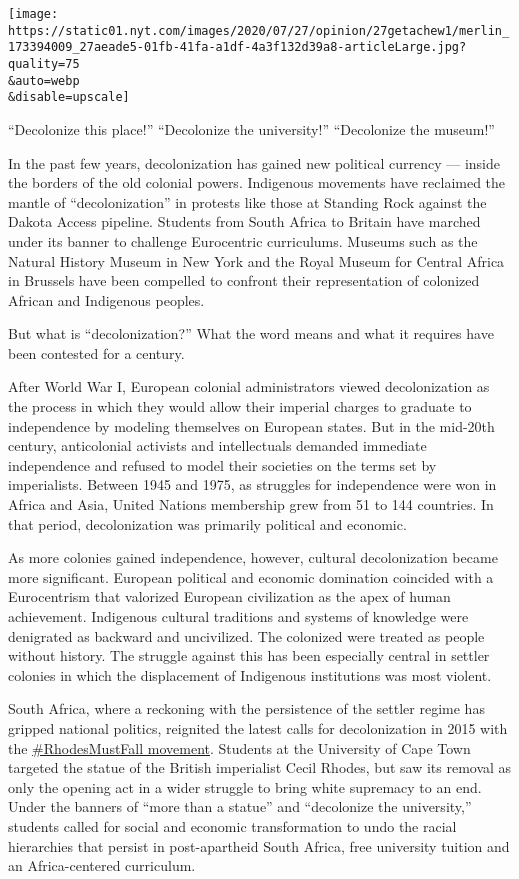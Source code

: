 \texttt{[image: https://static01.nyt.com/images/2020/07/27/opinion/27getachew1/merlin\_173394009\_27aeade5-01fb-41fa-a1df-4a3f132d39a8-articleLarge.jpg?quality=75\\\&auto=webp\\\&disable=upscale]}

``Decolonize this place!'' ``Decolonize the university!'' ``Decolonize
the museum!''

In the past few years, decolonization has gained new political currency
--- inside the borders of the old colonial powers. Indigenous movements
have reclaimed the mantle of ``decolonization'' in protests like those
at Standing Rock against the Dakota Access pipeline. Students from South
Africa to Britain have marched under its banner to challenge Eurocentric
curriculums. Museums such as the Natural History Museum in New York and
the Royal Museum for Central Africa in Brussels have been compelled to
confront their representation of colonized African and Indigenous
peoples.

But what is ``decolonization?'' What the word means and what it requires
have been contested for a century.

After World War I, European colonial administrators viewed
decolonization as the process in which they would allow their imperial
charges to graduate to independence by modeling themselves on European
states. But in the mid-20th century, anticolonial activists and
intellectuals demanded immediate independence and refused to model their
societies on the terms set by imperialists. Between 1945 and 1975, as
struggles for independence were won in Africa and Asia, United Nations
membership grew from 51 to 144 countries. In that period, decolonization
was primarily political and economic.

As more colonies gained independence, however, cultural decolonization
became more significant. European political and economic domination
coincided with a Eurocentrism that valorized European civilization as
the apex of human achievement. Indigenous cultural traditions and
systems of knowledge were denigrated as backward and uncivilized. The
colonized were treated as people without history. The struggle against
this has been especially central in settler colonies in which the
displacement of Indigenous institutions was most violent.

South Africa, where a reckoning with the persistence of the settler
regime has gripped national politics, reignited the latest calls for
decolonization in 2015 with the
\href{https://www.sabcnews.com/sabcnews/rhodesmustfall-wants-statues-representing-oppression-racism-removed/}{\#RhodesMustFall
movement}. Students at the University of Cape Town targeted the statue
of the British imperialist Cecil Rhodes, but saw its removal as only the
opening act in a wider struggle to bring white supremacy to an end.
Under the banners of ``more than a statue'' and ``decolonize the
university,'' students called for social and economic transformation to
undo the racial hierarchies that persist in post-apartheid South Africa,
free university tuition and an Africa-centered curriculum.


